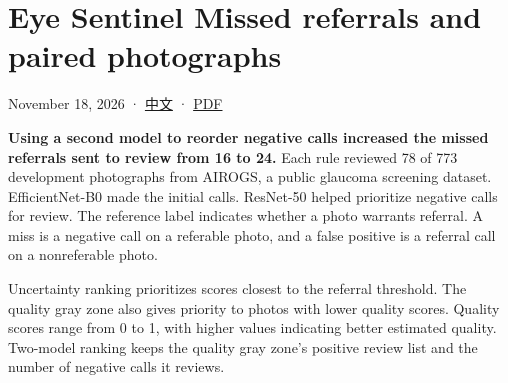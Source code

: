 \documentclass[
  10pt,
]{article}
\author{}
\date{}
\begin{document}
\section{Eye Sentinel \textbar{} Missed referrals and paired
photographs}\label{eye-sentinel-missed-referrals-and-paired-photographs}

November 18, 2026 · \href{review-failures.zh.md}{中文} ·
\href{review-failures.en.pdf}{PDF}

\textbf{Using a second model to reorder negative calls increased the
missed referrals sent to review from 16 to 24.} Each rule reviewed 78 of
773 development photographs from AIROGS, a public glaucoma screening
dataset. EfficientNet-B0 made the initial calls. ResNet-50 helped
prioritize negative calls for review. The reference label indicates
whether a photo warrants referral. A miss is a negative call on a
referable photo, and a false positive is a referral call on a
nonreferable photo.

Uncertainty ranking prioritizes scores closest to the referral
threshold. The quality gray zone also gives priority to photos with
lower quality scores. Quality scores range from 0 to 1, with higher
values indicating better estimated quality. Two-model ranking keeps the
quality gray zone's positive review list and the number of negative
calls it reviews.
\end{document}
